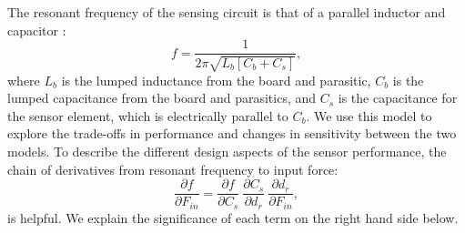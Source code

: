 

The resonant frequency of the sensing circuit is that of a parallel inductor and capacitor \cite{Nilsson2015}:
\begin{equation}
f = \frac{1}{2\pi\sqrt{L_b [C_b + C_s]}},
\end{equation}
where $L_b$ is the lumped inductance from the board and parasitic, 
$C_b$ is the lumped capacitance from the board and parasitics,
and $C_s$ is the capacitance for the sensor element, which is electrically parallel to $C_b$.
We use this model to explore the trade-offs in performance and 
changes in sensitivity between the two models.
To describe the different design aspects of the sensor performance, 
the chain of derivatives from resonant frequency to input force:
\begin{equation}
\frac{\partial f}{\partial F_{in}} = \frac{\partial f}{\partial C_s} \ \frac{\partial C_s}{\partial d_r} \ \frac{\partial d_r}{\partial F_{in}},
\end{equation}
is helpful. 
We explain the significance of each term on the right hand side below.

